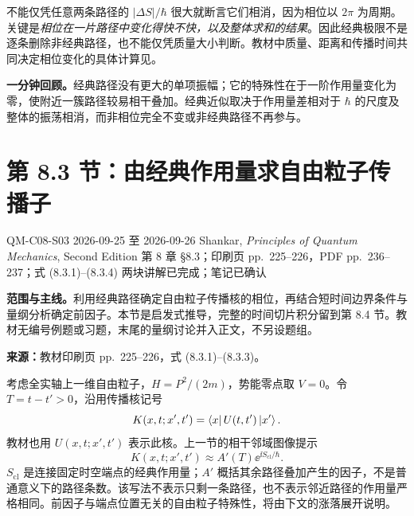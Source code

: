 不能仅凭任意两条路径的 $|\Delta S|/\hbar$ 很大就断言它们相消，因为相位以 $2\pi$ 为周期。关键是\emph{相位在一片路径中变化得快不快，以及整体求和的结果}。因此经典极限不是逐条删除非经典路径，也不能仅凭质量大小判断。教材中质量、距离和传播时间共同决定相位变化的具体计算见。

\textbf{一分钟回顾。}经典路径没有更大的单项振幅；它的特殊性在于一阶作用量变化为零，使附近一簇路径较易相干叠加。经典近似取决于作用量差相对于 $\hbar$ 的尺度及整体的振荡相消，而非相位完全不变或非经典路径不再参与。

\section{第 8.3 节：由经典作用量求自由粒子传播子}
\label{section:QM-C08-S03}
\studymeta
  {QM-C08-S03}
  {2026-09-25 至 2026-09-26}
  {Shankar, \textit{Principles of Quantum Mechanics}, Second Edition}
  {第 8 章 \S 8.3；印刷页 pp.~225--226，PDF pp.~236--237；式 (8.3.1)--(8.3.4)}
  {两块讲解已完成；笔记已确认}

\textbf{范围与主线。}利用经典路径确定自由粒子传播核的相位，再结合短时间边界条件与量纲分析确定前因子。本节是启发式推导，完整的时间切片积分留到第 8.4 节。教材无编号例题或习题，末尾的量纲讨论并入正文，不另设题组。

\textbf{来源：}教材印刷页 pp.~225--226，式 (8.3.1)--(8.3.3)。

考虑全实轴上一维自由粒子，$H=P^2/(2m)$，势能零点取 $V=0$。令 $T=t-t'>0$，沿用传播核记号
\begin{equation}
  K(x,t;x',t')=\left\langle x\right|U(t,t')\left|x'\right\rangle.
\end{equation}
教材也用 $U(x,t;x',t')$ 表示此核。上一节的相干邻域图像提示
\begin{equation}
  K(x,t;x',t')\approx A'(T)\ee^{\ii S_{\mathrm{cl}}/\hbar}.
  \label{eq:QM-C08-S03-ansatz}
\end{equation}
$S_{\mathrm{cl}}$ 是连接固定时空端点的经典作用量；$A'$ 概括其余路径叠加产生的因子，不是普通意义下的路径条数。该写法不表示只剩一条路径，也不表示邻近路径的作用量严格相同。前因子与端点位置无关的自由粒子特殊性，将由下文的涨落展开说明。

